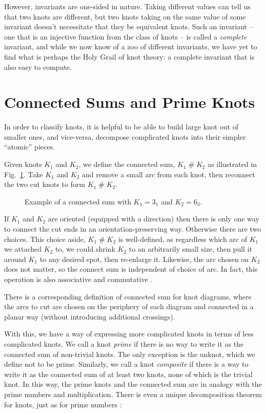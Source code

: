 \documentclass[12pt]{report}
\newcommand{\hash}{\ensuremath{\mathbin{\#}}}
\begin{document}
However, invariants are one-sided in nature. Taking different values can tell us that two knots are different, but two knots taking on the same value of some invariant doesn't necessitate that they be equivalent knots. Such an invariant -- one that is an injective function from the class of knots -- is called a \textit{complete} invariant, and while we now know of a zoo of different invariants, we have yet to find what is perhaps the Holy Grail of knot theory: a complete invariant that is also easy to compute.


\section{Connected Sums and Prime Knots}
In order to classify knots, it is helpful to be able to build large knot out of smaller ones, and vice-versa, decompose complicated knots into their simpler ``atomic'' pieces.

Given knots $K_{1}$ and $K_{2}$, we define the connected sum, $K_{1} \hash K_{2}$ as illustrated in Fig.~\ref{fig:connected-sum}. Take $K_{1}$ and $K_{2}$ and remove a small arc from each knot, then reconnect the two cut knots to form $K_{1} \hash K_{2}$.

\begin{figure}[hbt]
	\centering
	\def\svgscale{0.5}
	
	\caption{Example of a connected sum with $K_{1} = 3_{1}$ and $K_{2} = 6_{3}$.}
	\label{fig:connected-sum}
\end{figure}


If $K_{1}$ and $K_{2}$ are oriented (equipped with a direction) then there is only one way to connect the cut ends in an orientation-preserving way. Otherwise there are two choices. This choice aside, $K_{1} \hash K_{2}$ is well-defined, as regardless which arc of $K_{1}$ we attached $K_{2}$ to, we could shrink $K_{2}$ to an arbitrarily small size, then pull it around $K_{1}$ to any desired spot, then re-enlarge it. Likewise, the arc chosen on $K_{2}$ does not matter, so the connect sum is independent of choice of arc. In fact, this operation is also associative and commutative \cite[Corollary 7.13]{knots}.

There is a corresponding definition of connected sum for knot diagrams, where the arcs to cut are chosen on the periphery of each diagram and connected in a planar way (without introducing additional crossings).

With this, we have a way of expressing more complicated knots in terms of less complicated knots. We call a knot \textit{prime} if there is no way to write it as the connected sum of non-trivial knots. The only exception is the unknot, which we define not to be prime.  Similarly, we call a knot \textit{composite} if there is a way to write it as the connected sum of at least two knots, none of which is the trivial knot. In this way, the prime knots and the connected sum are in analogy with the prime numbers and multiplication. There is even a unique decomposition theorem for knots, just as for prime numbers \cite[Thoerem 7.12]{knots}:
\end{document}
